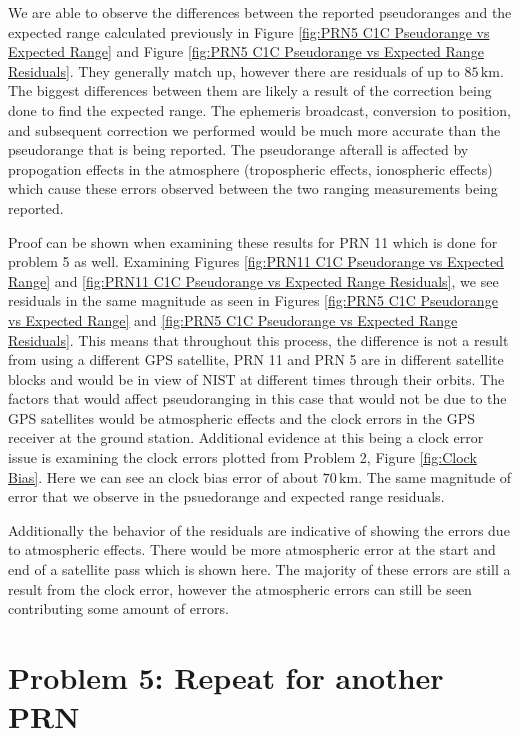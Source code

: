 \documentclass[11pt]{article}
\begin{document}
\hspace*{2em}We are able to observe the differences between the reported pseudoranges and
the expected range calculated previously in Figure \ref{fig:PRN5 C1C Pseudorange vs Expected Range}
and  Figure \ref{fig:PRN5 C1C Pseudorange vs Expected Range Residuals}. They generally match up, however there 
are residuals of up to $85\,\mathrm{km}$. The biggest differences between them are likely a result of the correction being 
done to find the expected range. The ephemeris broadcast, conversion to position, and subsequent correction we performed would
be much more accurate than the pseudorange that is being reported. The pseudorange afterall is affected by propogation effects in the
atmosphere (tropospheric effects, ionospheric effects) which cause these errors observed between the two ranging measurements 
being reported.

\hspace*{2em}Proof can be shown when examining these results for PRN 11 which is done for problem 5
as well. Examining Figures \ref{fig:PRN11 C1C Pseudorange vs Expected Range} and \ref{fig:PRN11 C1C Pseudorange vs Expected Range Residuals},
we see residuals in the same magnitude as seen in Figures \ref{fig:PRN5 C1C Pseudorange vs Expected Range} and \ref{fig:PRN5 C1C Pseudorange vs Expected Range Residuals}.
This means that throughout this process, the difference is not a result from using a different GPS satellite, PRN 11 and PRN 5
are in different satellite blocks and would be in view of NIST at different times through their orbits. The factors that would affect 
pseudoranging in this case that would not be due to the GPS satellites would be atmospheric effects and the clock errors in the GPS
receiver at the ground station. Additional evidence at this being a clock error issue is examining the clock
errors plotted from Problem 2, Figure \ref{fig:Clock Bias}. Here we can see an clock bias error of about $70\,\mathrm{km}$.
The same magnitude of error that we observe in the psuedorange and expected range residuals.

\hspace*{2em}Additionally the behavior of the residuals are indicative of showing the errors due to atmospheric effects.
There would be more atmospheric error at the start and end of a satellite pass which is shown here. The majority of these errors
are still a result from the clock error, however the atmospheric errors can still be seen contributing some amount of errors.

\newpage
\section*{Problem 5: Repeat for another PRN}
\end{document}
